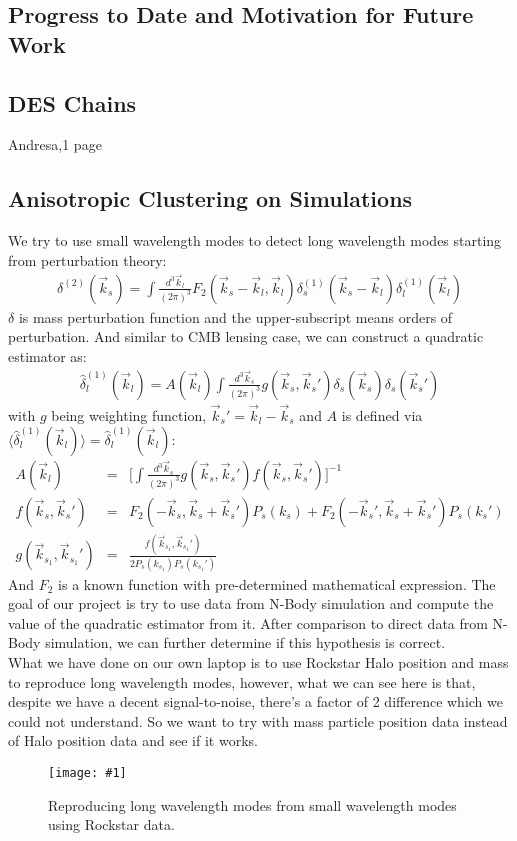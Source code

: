 \documentclass[12pt]{article}
\newcommand{\sfig}[2]{
\begin{center}
\texttt{[image: \#1]}
\end{center}
        }
\newcommand{\Spng}[2]{
    \begin{figure}[htb]
    \sfig{#1.png}{.9\columnwidth}
    \caption{{\small #2}}
    \label{fig:#1}
    \end{figure}
}
\begin{document}
\begin{small}
\section{Progress to Date and Motivation for Future Work}

\subsection{DES Chains}
Andresa,1 page
\subsection{Anisotropic Clustering on Simulations}
We try to use small wavelength modes to detect long wavelength modes starting from perturbation theory:
\begin{eqnarray}
\delta^{(2)}(\vec{k}_s)=\int\frac{d^{3}\vec{k}_l}{(2 \pi)^3}F_2(\vec{k}_s-\vec{k}_l,\vec{k}_l)\delta_{s}^{(1)}(\vec{k}_s-\vec{k}_l)\delta_l^{(1)}(\vec{k}_l)
\end{eqnarray}
$\delta$ is mass perturbation function and the upper-subscript means orders of perturbation. And similar to CMB lensing case, we can construct a quadratic estimator as:
\begin{eqnarray}
\hat{\delta}_l^{(1)}(\vec{k}_l)=A(\vec{k}_l)\int \frac{d^3 \vec{k}_s}{(2\pi)^3} g(\vec{k}_s,\vec{k}_s')\delta_s(\vec{k}_s)\delta_s(\vec{k}_s')
\end{eqnarray}
with $g$ being weighting function, $\vec{k}_s'=\vec{k}_l-\vec{k}_s$ and $A$ is defined via $\langle \hat{\delta}_l^{(1)}(\vec{k}_l) \rangle=\hat{\delta}_l^{(1)}(\vec{k}_l)$:
\begin{eqnarray}
A(\vec{k}_l)&=&\bigg[\int \frac{d^3 \vec{k}_s}{(2\pi)^3} g(\vec{k}_s,\vec{k}_s')f(\vec{k}_s,\vec{k}_s')  \bigg]^{-1} \\
f(\vec{k}_s,\vec{k}_s')&=&F_2(-\vec{k}_s,\vec{k}_s+\vec{k}_s')P_s(k_s)+F_2(-\vec{k}_s',\vec{k}_s+\vec{k}_s')P_s(k_s') \\
g(\vec{k}_{s_1},\vec{k}_{s_1}')&=&\frac{f(\vec{k}_{s_1},\vec{k}_{s_1}')}{2P_s(k_{s_1})P_s(k_{s_1}')}
\end{eqnarray}
And $F_2$ is a known function with pre-determined mathematical expression. The goal of our project is try to use data from N-Body simulation and compute the value of the quadratic estimator from it. After comparison to direct data from N-Body simulation, we can further determine if this hypothesis is correct.\\
What we have done on our own laptop is to use Rockstar Halo position and mass to reproduce long wavelength modes, however, what we can see here is that, despite we have a decent signal-to-noise, there's a factor of 2 difference which we could not understand. So we want to try with mass particle position data instead of Halo position data and see if it works. \\
\Spng{nbody}{Reproducing long wavelength modes from small wavelength modes using Rockstar data.}



\end{small}
\end{document}
